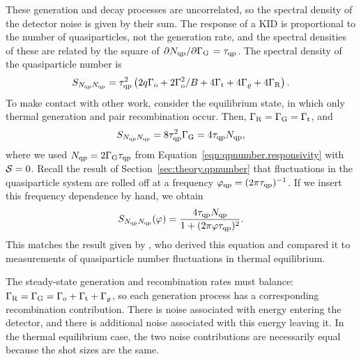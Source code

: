 These generation and decay processes are uncorrelated, so the spectral density of the detector noise is given by their sum.
The response of a KID is proportional to the number of quasiparticles, not the generation rate, and the spectral densities of these are related by the square of $\pdv*{N_{\mathrm{qp}}}{\Gamma_{\mathrm{G}}} = \tau_{\mathrm{qp}}$.
The spectral density of the quasiparticle number is
\begin{equation}
S_{N_{\mathrm{qp}} N_{\mathrm{qp}}}
  =
  \tau_{\mathrm{qp}}^2
  \left(
  2 q \Gamma_{\mathrm{o}} + 2 \Gamma_{\mathrm{o}}^2 / B
  + 4 \Gamma_{\mathrm{t}} + 4 \Gamma_\varrho + 4 \Gamma_{\mathrm{R}} \right).
\label{eqn:spectraldensity_qpnumber}
\end{equation}
To make contact with other work, consider the equilibrium state, in which only thermal generation and pair recombination occur.
Then, 
$\Gamma_{\mathrm{R}} = \Gamma_{\mathrm{G}} = \Gamma_{\mathrm{t}}$,
and
\begin{equation}
S_{N_{\mathrm{qp}} N_{\mathrm{qp}}}
  =
  8 \tau_{\mathrm{qp}}^2 \Gamma_{\mathrm{G}}
  =
  4 \tau_{\mathrm{qp}} N_{\mathrm{qp}},
\end{equation}
where we used
$N_{\mathrm{qp}} = 2 \Gamma_{\mathrm{G}} \tau_{\mathrm{qp}}$ from
Equation~\ref{eqn:qpnumber.responsivity} with $\mathcal{S} = 0$.
Recall the result of Section~\ref{sec:theory.qpnumber} that fluctuations in the quasiparticle system are rolled off at a frequency
$\varphi_{\mathrm{qp}} = (2 \pi \tau_{\mathrm{qp}})^{-1}$.
If we insert this frequency dependence by hand, we obtain
\begin{equation}
S_{N_{\mathrm{qp}} N_{\mathrm{qp}}}(\varphi)
  =
  \frac{4 \tau_{\mathrm{qp}} N_{\mathrm{qp}}}{1 + (2 \pi \varphi \tau_{\mathrm{qp}})^2}.
\end{equation}
This matches the result given by \textcite{Wilson2004PRB}, who derived this equation and compared it to measurements of quasiparticle number fluctuations in thermal equilibrium.

The steady-state generation and recombination rates must balance:
$\Gamma_{\mathrm{R}}
  =
  \Gamma_{\mathrm{G}}
  = 
  \Gamma_{\mathrm{o}} + \Gamma_{\mathrm{t}} + \Gamma_\varrho$,
so each generation process has a corresponding recombination contribution.
There is noise associated with energy entering the detector, and there is additional noise associated with this energy leaving it.
In the thermal equilibrium case, the two noise contributions are necessarily equal because the shot sizes are the same.

